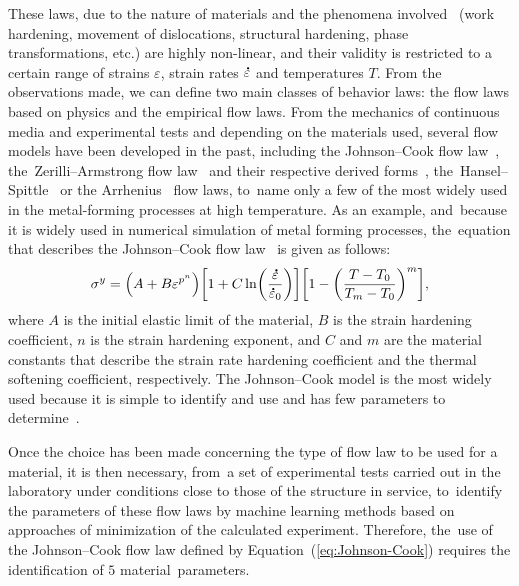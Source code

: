 \documentclass[algorithms,article,accept,pdftex,moreauthors]{Definitions/mdpi}
\DeclareRobustCommand{\mdot}[1]{\accentset{\mbox{\bfseries .}}{#1}}
\begin{document}
These laws, due to the nature of materials and the phenomena involved~\cite{Lennon-2004, Zhang-2012} (work hardening, movement of dislocations, structural hardening, phase transformations, etc.) are highly non-linear, and their validity is restricted to a certain range of strains $\varepsilon$, strain rates $\mdot\varepsilon$ and temperatures $T$.
From the observations made, we can define two main classes of behavior laws: the flow laws based on physics and the empirical flow laws.
From the mechanics of continuous media and experimental tests and depending on the materials used, several flow models have been developed in the past, including the Johnson--Cook flow law~\cite{Johnson-1983, Johnson-1988}, the~Zerilli--Armstrong flow law~\cite{Zerilli-1987} and their respective derived \mbox{forms~\cite{Lin-2011, Li-2013, Zhang-2015, Zhou-2020, Jia-2021, Rule-1998, Lin2010, Muralli-2017, Cheng-2021}}, the~Hansel--Spittle~\cite{Hensel-1978, Chadha-2018} or the Arrhenius~\cite{Jonas-1969, He-2013, Liang-2022} flow laws, to~name only a few of the most widely used in the metal-forming processes at high temperature.
As an example, and~because it is widely used in numerical simulation of metal forming processes, the~equation that describes the Johnson--Cook flow law~\cite{Johnson-1983} is given as follows:
\begin{equation}
\sigma^y=\left(A+B\varepsilon^{p^{n}}\right) \left[1+C\ln\left(\frac{\mdot\varepsilon}{\mdot\varepsilon_0}\right)\right] \left[1-\left(\frac{T-T_0}{T_m-T_0}\right)^{m}\right],\label{eq:Johnson-Cook}
\end{equation}
where $A$ is the initial elastic limit of the material, $B$ is the strain hardening coefficient, $n$ is the strain hardening exponent, and $C$ and $m$ are the material constants that describe the strain rate hardening coefficient and the thermal softening coefficient, respectively.
The Johnson--Cook model is the most widely used because it is simple to identify and use and has few parameters to determine~\cite{NematNasser-2003, Khan-2004}.

Once the choice has been made concerning the type of flow law to be used for a material, it is then necessary, from~a set of experimental tests carried out in the laboratory under conditions close to those of the structure in service, to~identify the parameters of these flow laws by machine learning methods based on approaches of minimization of the calculated experiment.
Therefore, the~use of the Johnson--Cook flow law defined by Equation~(\ref{eq:Johnson-Cook}) requires the identification of $5$ material~parameters.
\end{document}
